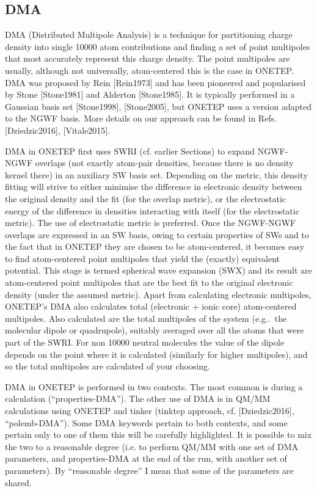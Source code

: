 \documentclass[letterpaper,10pt,english]{sphinxmanual}
\begin{document}
\subsection{DMA}
\label{\detokenize{hfx:dma}}
DMA (Distributed Multipole Analysis) is a technique for partitioning
charge density into single 10000 atom contributions and finding a set of
point multipoles that most accurately represent this charge density. The
point multipoles are usually, although not universally, atom-centered \textendash{}
this is the case in ONETEP. DMA was proposed by Rein
{[}Rein1973{]} and has been pioneered and popularised by Stone
{[}Stone1981{]} and Alderton
{[}Stone1985{]}. It is typically performed in a
Gaussian basis set {[}Stone1998{]}, {[}Stone2005{]}, but ONETEP uses a
version adapted to the NGWF basis. More details on our approach can be
found in Refs. {[}Dziedzic2016{]}, {[}Vitale2015{]}.

DMA in ONETEP first uses SWRI (cf. earlier Sections) to expand NGWF-NGWF
overlaps (not exactly atom-pair densities, because there is no density
kernel there) in an auxiliary SW basis set. Depending on the metric,
this density fitting will strive to either minimise the difference in
electronic density between the original density and the fit (for the
overlap metric), or the electrostatic energy of the difference in
densities interacting with itself (for the electrostatic metric). The
use of electrostatic metric is preferred. Once the NGWF-NGWF overlaps
are expressed in an SW basis, owing to certain properties of SWs and to
the fact that in ONETEP they are chosen to be atom-centered, it becomes
easy to find atom-centered point multipoles that yield the (exactly)
equivalent potential. This stage is termed spherical wave expansion
(SWX) and its result are atom-centered point multipoles that are the
best fit to the original electronic density (under the assumed metric).
Apart from calculating electronic multipoles, ONETEP’s DMA also
calculates total (electronic + ionic core) atom-centered multipoles.
Also calculated are the total multipoles of the system (e.g.. the
molecular dipole or quadrupole), suitably averaged over all the atoms
that were part of the SWRI. For non 10000 neutral molecules the value of
the dipole depends on the point where it is calculated (similarly for
higher multipoles), and so the total multipoles are calculated  of your choosing.

DMA in ONETEP is performed in two contexts. The most common is during a
 calculation (“properties-DMA”). The other use of DMA
is in QM/MM calculations using ONETEP and tinker (tinktep approach,
cf. {[}Dziedzic2016{]}, “polemb-DMA”). Some DMA keywords
pertain to both contexts, and some pertain only to one of them \textendash{} this
will be carefully highlighted. It is possible to mix the two to a
reasonable degree (i.e. to perform QM/MM with one set of DMA parameters,
and properties-DMA at the end of the run, with another set of
parameters). By “reasonable degree” I mean that some of the parameters
are shared.
\end{document}
